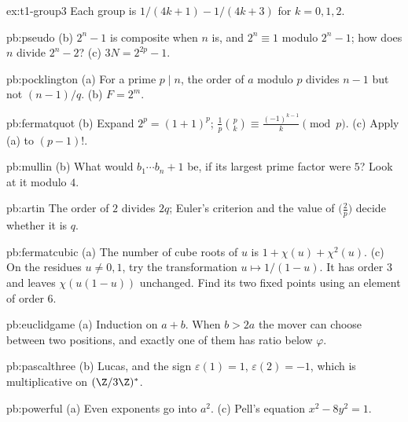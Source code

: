 \begin{hint}{ex:t1-group3}
Each group is $1/(4k+1)-1/(4k+3)$ for $k=0,1,2$.
\end{hint}

\begin{hint}{pb:pseudo}
(b) $2^n-1$ is composite when $n$ is, and $2^n\equiv1$ modulo $2^n-1$; how does $n$ divide $2^n-2$? (c) $3N=2^{2p}-1$.
\end{hint}

\begin{hint}{pb:pocklington}
(a) For a prime $p\mid n$, the order of $a$ modulo $p$ divides $n-1$ but not $(n-1)/q$. (b) $F=2^m$.
\end{hint}

\begin{hint}{pb:fermatquot}
(b) Expand $2^p=(1+1)^p$; $\frac1p\binom pk\equiv\frac{(-1)^{k-1}}k\pmod p$. (c) Apply (a) to $(p-1)!$.
\end{hint}

\begin{hint}{pb:mullin}
(b) What would $b_1\cdots b_n+1$ be, if its largest prime factor were $5$? Look at it modulo $4$.
\end{hint}

\begin{hint}{pb:artin}
The order of $2$ divides $2q$; Euler's criterion and the value of $\bigl(\frac2p\bigr)$ decide whether it is $q$.
\end{hint}

\begin{hint}{pb:fermatcubic}
(a) The number of cube roots of $u$ is $1+\chi(u)+\chi^2(u)$.
(c) On the residues $u\ne0,1$, try the transformation
$u\mapsto1/(1-u)$. It has order $3$ and leaves
$\chi(u(1-u))$ unchanged. Find its two fixed points
using an element of order $6$.
\end{hint}

\begin{hint}{pb:euclidgame}
(a) Induction on $a+b$. When $b>2a$ the mover can choose between two positions, and exactly one of them has ratio below
$\varphi$.
\end{hint}

\begin{hint}{pb:pascalthree}
(b) Lucas, and the sign $\varepsilon(1)=1$, $\varepsilon(2)=-1$, which is multiplicative on $(\Z/3\Z)^*$.
\end{hint}

\begin{hint}{pb:powerful}
(a) Even exponents go into $a^2$. (c) Pell's equation $x^2-8y^2=1$.
\end{hint}

